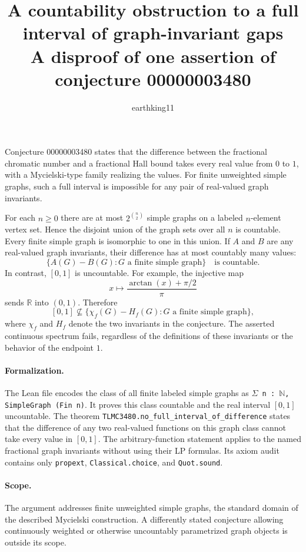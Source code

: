 \documentclass[11pt]{article}
\title{A countability obstruction to a full interval of graph-invariant gaps\\
  A disproof of one assertion of conjecture 00000003480}
\author{earthking11}
\date{}
\begin{document}
\maketitle

Conjecture 00000003480 states that the difference between the fractional
chromatic number and a fractional Hall bound takes every real value from
$0$ to $1$, with a Mycielski-type family realizing the values. For finite
unweighted simple graphs, such a full interval is impossible for any pair of
real-valued graph invariants.

For each $n\geq 0$ there are at most $2^{\binom n2}$ simple graphs on a
labeled $n$-element vertex set. Hence the disjoint union of the graph sets
over all $n$ is countable. Every finite simple graph is isomorphic to one
in this union. If $A$ and $B$ are any real-valued graph invariants, their
difference has at most countably many values:
\[
  \bigl\{A(G)-B(G):G\text{ a finite simple graph}\bigr\}
  \quad\text{is countable}.
\]
In contrast, $[0,1]$ is uncountable. For example, the injective map
\[
  x\longmapsto\frac{\arctan(x)+\pi/2}{\pi}
\]
sends $\mathbb R$ into $(0,1)$. Therefore
\[
  [0,1]\not\subseteq
  \bigl\{\chi_f(G)-H_f(G):G\text{ a finite simple graph}\bigr\},
\]
where $\chi_f$ and $H_f$ denote the two invariants in the conjecture.
The asserted continuous spectrum fails, regardless of the definitions of
these invariants or the behavior of the endpoint $1$.

\paragraph{Formalization.}
The Lean file encodes the class of all finite labeled simple graphs as
\texttt{$\Sigma$ n : $\mathbb N$, SimpleGraph (Fin n)}. It proves this class
countable and the real interval $[0,1]$ uncountable. The theorem
\texttt{TLMC3480.no\_full\_interval\_of\_difference} states that the
difference of any two real-valued functions on this graph class cannot take
every value in $[0,1]$. The arbitrary-function statement applies to the
named fractional graph invariants without using their LP formulas. Its
axiom audit contains only \texttt{propext}, \texttt{Classical.choice}, and
\texttt{Quot.sound}.

\paragraph{Scope.}
The argument addresses finite unweighted simple graphs, the standard domain
of the described Mycielski construction. A differently stated conjecture
allowing continuously weighted or otherwise uncountably parametrized graph
objects is outside its scope.
\end{document}
